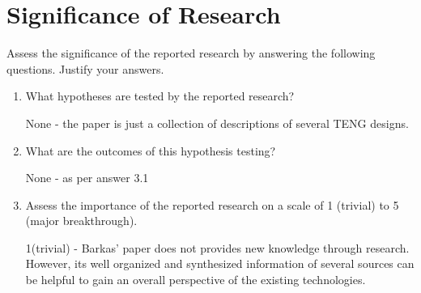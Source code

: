 \documentclass{article}
\begin{document}
\section{Significance of Research}
Assess the significance of the reported research by answering the
following questions. Justify your answers.
\begin{enumerate}

\item   What hypotheses are tested by the reported research?
\begin{mdframed}
None - the paper is just a collection of descriptions of several TENG designs.
\end{mdframed}

\item   What are the outcomes of this hypothesis testing?
\begin{mdframed}
None - as per answer 3.1
\end{mdframed}

\item   Assess the importance of the reported research on a scale of 1
(trivial) to 5 (major breakthrough).
\begin{mdframed}
1(trivial) - Barkas' paper does not provides new knowledge through research. However, its well organized and synthesized information of several sources can be helpful to gain an overall perspective of the existing technologies. 
\end{mdframed}
\end{enumerate}

\end{document}
